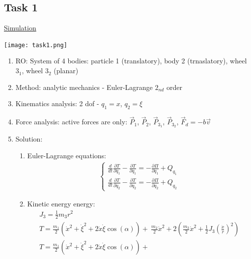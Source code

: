\subsection*{Task 1}

\href{https://github.com/lvjonok/f22-theoretical-mechanics/blob/master/homework7/res.gif}{Simulation}

\texttt{[image: task1.png]}

\begin{enumerate}
    \item RO: System of 4 bodies: particle 1 (translatory),
          body 2 (trnaslatory), wheel $3_1$, wheel $3_2$ (planar)
    \item Method: analytic mechanics - Euler-Lagrange $2_{nd}$ order
    \item Kinematics analysis: 2 dof - $q_1 = x$, $q_2 = \xi$
    \item Force analysis: active forces are only:
          $\vec{P}_1$, $\vec{P}_2$, $\vec{P}_{3_1}$, $\vec{P}_{3_2}$, $\vec{F}_d = -b \vec{v}$
    \item Solution:
          \begin{enumerate}
              \item Euler-Lagrange equations:
                    \begin{align}
                        \begin{cases}
                            \frac{d}{dt} \frac{\partial T}{\partial \dot{q}_1} - \frac{\partial T}{\partial q_1} = -\frac{\partial \Pi}{\partial q_1} + Q_{q_1}
                            \\[10pt]
                            \frac{d}{dt} \frac{\partial T}{\partial \dot{q}_2} - \frac{\partial T}{\partial q_2} = -\frac{\partial \Pi}{\partial q_2} + Q_{q_2}
                        \end{cases}
                    \end{align}
              \item Kinetic energy energy:
                    \begin{align}
                        J_3 = \frac{1}{2} m_3 r^2                                                                     \\
                        T = \frac{m_1}{2} (\dot{x}^2 + \dot{\xi}^2 + 2\dot{x}\dot{\xi} \cos(\alpha)) + \
                        \frac{m_2}{2} \dot{x}^2 + 2 (\frac{m_3}{2} \dot{x}^2 + \frac{1}{2} J_3 (\frac{\dot{x}}{r})^2) \\
                        T = \frac{m_1}{2} (\dot{x}^2 + \dot{\xi}^2 + 2\dot{x}\dot{\xi} \cos(\alpha)) + \

\end{align}
\end{enumerate}
\end{enumerate}
